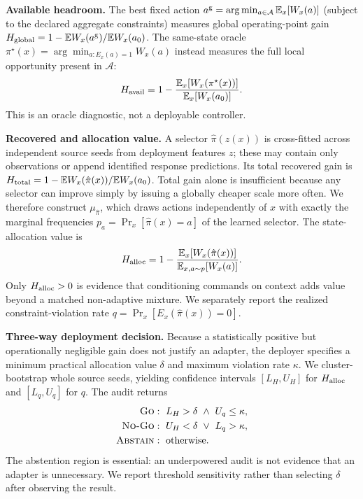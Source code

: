 \documentclass{article}
\begin{document}
\textbf{Available headroom.}
The best fixed action
$a^{\rm g}=\arg\min_{a\in\mathcal A}\mathbb E_x[W_x(a)]$ (subject to the
declared aggregate constraints) measures global operating-point gain
$H_{\rm global}=1-\mathbb E W_x(a^{\rm g})/\mathbb E W_x(a_0)$.
The same-state oracle $\pi^\star(x)=\arg\min_{a:E_x(a)=1}W_x(a)$ instead measures
the full local opportunity present in $\mathcal A$:
\begin{equation}
H_{\rm avail}=1-\frac{\mathbb E_x[W_x(\pi^\star(x))]}
{\mathbb E_x[W_x(a_0)]}.
\label{eq:havailable}
\end{equation}
This is an oracle diagnostic, not a deployable controller.

\textbf{Recovered and allocation value.}
A selector $\hat\pi(z(x))$ is cross-fitted across independent source seeds from
deployment features $z$; these may contain only observations or append identified
response predictions. Its total recovered gain is
$H_{\rm total}=1-\mathbb E W_x(\hat\pi(x))/\mathbb E W_x(a_0)$.
Total gain alone is insufficient because any selector can improve simply by
issuing a globally cheaper scale more often. We therefore construct
$\mu_{\hat\pi}$, which draws actions independently of $x$ with exactly the
marginal frequencies
$p_a=\Pr_x[\hat\pi(x)=a]$ of the learned selector. The state-allocation value is
\begin{equation}
H_{\rm alloc}=1-\frac{\mathbb E_x[W_x(\hat\pi(x))]}
{\mathbb E_{x,a\sim p}[W_x(a)]}.
\label{eq:halloc}
\end{equation}
Only $H_{\rm alloc}>0$ is evidence that conditioning commands on context adds
value beyond a matched non-adaptive mixture. We separately report the realized
constraint-violation rate
$q=\Pr_x[E_x(\hat\pi(x))=0]$.

\textbf{Three-way deployment decision.}
Because a statistically positive but operationally negligible gain does not
justify an adapter, the deployer specifies a minimum practical allocation value
$\delta$ and maximum violation rate $\kappa$. We cluster-bootstrap whole source
seeds, yielding confidence intervals $[L_H,U_H]$ for $H_{\rm alloc}$ and
$[L_q,U_q]$ for $q$. The audit returns
\begin{equation}
\begin{aligned}
\textsc{Go}&:\ L_H>\delta\ \land\ U_q\le\kappa,\\
\textsc{No-Go}&:\ U_H<\delta\ \lor\ L_q>\kappa,\\
\textsc{Abstain}&:\ \text{otherwise}.
\end{aligned}
\label{eq:audit-decision}
\end{equation}
The abstention region is essential: an underpowered audit is not evidence that
an adapter is unnecessary. We report threshold sensitivity rather than selecting
$\delta$ after observing the result.
\end{document}
